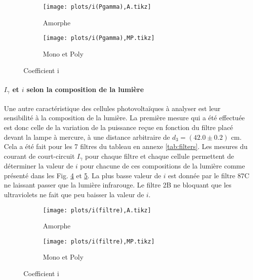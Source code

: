 \begin{figure}
    \centering
    \begin{subfigure}[t]{0.45\linewidth}
        \centering
        \texttt{[image: plots/i(Pgamma),A.tikz]}
        \caption{Amorphe}
        \label{plot:5a}
    \end{subfigure}
    \begin{subfigure}[t]{0.45\linewidth}
        \centering
        \texttt{[image: plots/i(Pgamma),MP.tikz]}
        \caption{Mono et Poly}
        \label{plot:5b}
    \end{subfigure}
    \caption{Coefficient i}
    \label{plot:5}
\end{figure}

\paragraph*{\(I_\gamma\) et \(i\) selon la composition de la lumière}
Une autre caractéristique des cellules photovoltaïques à analyser est leur sensibilité à la composition de la lumière. La première mesure qui a été effectuée est donc celle de la variation de la puissance reçue en fonction du filtre placé devant la lampe à mercure, à une distance arbitraire de \(d_3 = (42.0 \pm 0.2)\) \unit{\centi\meter}. Cela a été fait pour les 7 filtres du tableau en annexe \ref{tab:filters}. Les mesures du courant de court-circuit \(I_\gamma\) pour chaque filtre et chaque cellule permettent de déterminer la valeur de \(i\) pour chacune de ces compositions de la lumière comme présenté dans les Fig. \ref{plot:6a} et \ref{plot:6b}. La plus basse valeur de \(i\) est donnée par le filtre 87C ne laissant passer que la lumière infrarouge. Le filtre 2B ne bloquant que les ultraviolets ne fait que peu baisser la valeur de \(i\).

\begin{figure}
    \centering
    \begin{subfigure}[t]{0.45\linewidth}
        \centering
        \texttt{[image: plots/i(filtre),A.tikz]}
        \caption{Amorphe}
        \label{plot:6a}
    \end{subfigure}
    \begin{subfigure}[t]{0.45\linewidth}
        \centering
        \texttt{[image: plots/i(filtre),MP.tikz]}
        \caption{Mono et Poly}
        \label{plot:6b}
    \end{subfigure}
    \caption{Coefficient i}
    \label{plot:6}
\end{figure}

